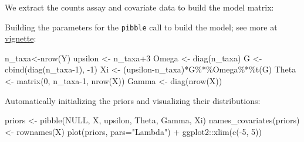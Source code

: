 \documentclass[
]{book}
\newenvironment{Shaded}{\begin{snugshade}}{\end{snugshade}}
\newcommand{\AttributeTok}[1]{\textcolor[rgb]{0.77,0.63,0.00}{#1}}
\newcommand{\CommentTok}[1]{\textcolor[rgb]{0.56,0.35,0.01}{\textit{#1}}}
\newcommand{\ConstantTok}[1]{\textcolor[rgb]{0.00,0.00,0.00}{#1}}
\newcommand{\DecValTok}[1]{\textcolor[rgb]{0.00,0.00,0.81}{#1}}
\newcommand{\FunctionTok}[1]{\textcolor[rgb]{0.00,0.00,0.00}{#1}}
\newcommand{\NormalTok}[1]{#1}
\newcommand{\OtherTok}[1]{\textcolor[rgb]{0.56,0.35,0.01}{#1}}
\newcommand{\SpecialCharTok}[1]{\textcolor[rgb]{0.00,0.00,0.00}{#1}}
\newcommand{\StringTok}[1]{\textcolor[rgb]{0.31,0.60,0.02}{#1}}
\begin{document}
We extract the counts assay and covariate data to build the model
matrix:

\begin{Shaded}
\end{Shaded}

Building the parameters for the \texttt{pibble} call to build the model; see more at \href{https://jsilve24.github.io/fido/articles/introduction-to-fido.html}{vignette}:

\begin{Shaded}
\begin{Highlighting}[]
\NormalTok{n\_taxa}\OtherTok{\textless{}{-}}\FunctionTok{nrow}\NormalTok{(Y)}
\NormalTok{upsilon }\OtherTok{\textless{}{-}}\NormalTok{ n\_taxa}\SpecialCharTok{+}\DecValTok{3}
\NormalTok{Omega }\OtherTok{\textless{}{-}} \FunctionTok{diag}\NormalTok{(n\_taxa)}
\NormalTok{G }\OtherTok{\textless{}{-}} \FunctionTok{cbind}\NormalTok{(}\FunctionTok{diag}\NormalTok{(n\_taxa}\DecValTok{{-}1}\NormalTok{), }\SpecialCharTok{{-}}\DecValTok{1}\NormalTok{)}
\NormalTok{Xi }\OtherTok{\textless{}{-}}\NormalTok{ (upsilon}\SpecialCharTok{{-}}\NormalTok{n\_taxa)}\SpecialCharTok{*}\NormalTok{G}\SpecialCharTok{\%*\%}\NormalTok{Omega}\SpecialCharTok{\%*\%}\FunctionTok{t}\NormalTok{(G)}
\NormalTok{Theta }\OtherTok{\textless{}{-}} \FunctionTok{matrix}\NormalTok{(}\DecValTok{0}\NormalTok{, n\_taxa}\DecValTok{{-}1}\NormalTok{, }\FunctionTok{nrow}\NormalTok{(X))}
\NormalTok{Gamma }\OtherTok{\textless{}{-}} \FunctionTok{diag}\NormalTok{(}\FunctionTok{nrow}\NormalTok{(X))}
\end{Highlighting}
\end{Shaded}

Automatically initializing the priors and visualizing their distributions:

\begin{Shaded}
\begin{Highlighting}[]
\NormalTok{priors }\OtherTok{\textless{}{-}} \FunctionTok{pibble}\NormalTok{(}\ConstantTok{NULL}\NormalTok{, X, upsilon, Theta, Gamma, Xi)}
\FunctionTok{names\_covariates}\NormalTok{(priors) }\OtherTok{\textless{}{-}} \FunctionTok{rownames}\NormalTok{(X)}
\FunctionTok{plot}\NormalTok{(priors, }\AttributeTok{pars=}\StringTok{"Lambda"}\NormalTok{) }\SpecialCharTok{+}\NormalTok{ ggplot2}\SpecialCharTok{::}\FunctionTok{xlim}\NormalTok{(}\FunctionTok{c}\NormalTok{(}\SpecialCharTok{{-}}\DecValTok{5}\NormalTok{, }\DecValTok{5}\NormalTok{))}
\end{Highlighting}
\end{Shaded}
\end{document}
